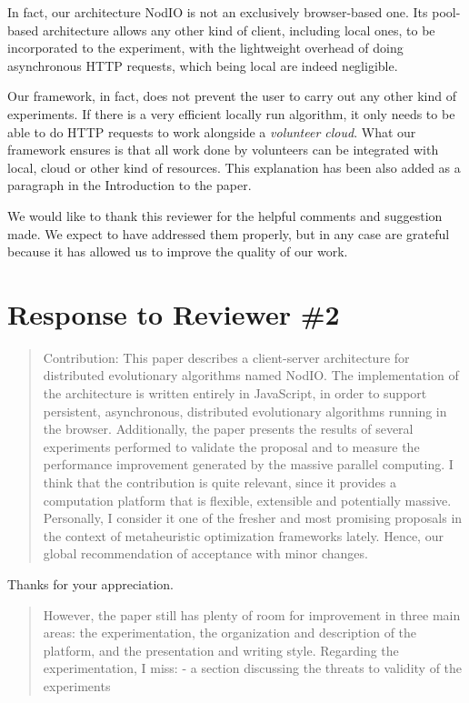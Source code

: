 \documentclass[preprint]{elsarticle}
\begin{document}
In fact, our architecture {\sf NodIO} is
not an exclusively browser-based one. Its pool-based architecture allows
any other kind of client, including local ones, to be incorporated to
the experiment, with the lightweight overhead of doing asynchronous
HTTP requests, which being local are indeed negligible. 

Our framework, in fact, does not prevent the user to carry out any other kind of
experiments. If there is a very efficient locally run algorithm, it only
needs to be able to do HTTP requests to work alongside a {\em
  volunteer cloud}. What our framework ensures is that all work done
by volunteers can be integrated with local, cloud or other kind of
resources. This explanation has been also added as a paragraph in the
Introduction to the paper.

We would like to thank this reviewer for the helpful comments and
suggestion made. We expect to have addressed them properly, but in any
case are grateful because it has allowed us to improve the quality of
our work. 

\section{Response to Reviewer \#2}

\begin{quote}
Contribution:
This paper describes a client-server architecture for distributed
evolutionary algorithms named NodIO. 
The implementation of the architecture is written entirely in
JavaScript, in order to support persistent, 
asynchronous, distributed evolutionary algorithms running in the browser.
Additionally, the paper presents the results of several experiments
performed to validate the proposal and 
to measure the performance improvement generated by the massive parallel computing.
I think that the contribution is quite relevant, since it provides a
computation platform that is flexible, 
extensible and potentially massive. Personally, I consider it one of the fresher and most promising
proposals in the context of metaheuristic optimization frameworks lately. Hence, our global
recommendation of acceptance with minor changes.
\end{quote}

Thanks for your appreciation.

\begin{quote}
However, the paper still has plenty of room for improvement in three main areas: the experimentation, the
organization and description of the platform, and the presentation and writing style.
Regarding the experimentation, I miss:
-  a section discussing the threats to validity of the experiments

\end{quote}
\end{document}
